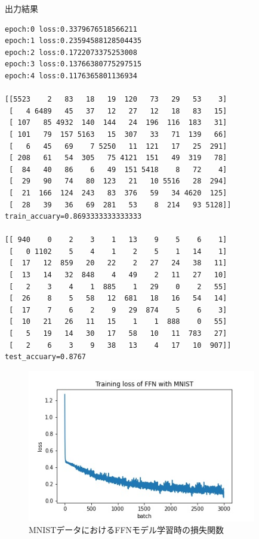 \documentclass[11pt, a4paper]{jsarticle}
\begin{document}
  \begin{itembox}[l]{出力結果}
    {\footnotesize
    \begin{verbatim}
epoch:0 loss:0.3379676518566211
epoch:1 loss:0.23594588128504435
epoch:2 loss:0.1722073375253008
epoch:3 loss:0.13766380775297515
epoch:4 loss:0.1176365801136934

[[5523    2   83   18   19  120   73   29   53    3]
 [   4 6489   45   37   12   27   12   18   83   15]
 [ 107   85 4932  140  144   24  196  116  183   31]
 [ 101   79  157 5163   15  307   33   71  139   66]
 [   6   45   69    7 5250   11  121   17   25  291]
 [ 208   61   54  305   75 4121  151   49  319   78]
 [  84   40   86    6   49  151 5418    8   72    4]
 [  29   90   74   80  123   21   10 5516   28  294]
 [  21  166  124  243   83  376   59   34 4620  125]
 [  28   39   36   69  281   53    8  214   93 5128]]
train_accuary=0.8693333333333333

[[ 940    0    2    3    1   13    9    5    6    1]
 [   0 1102    5    4    1    2    5    1   14    1]
 [  17   12  859   20   22    2   27   24   38   11]
 [  13   14   32  848    4   49    2   11   27   10]
 [   2    3    4    1  885    1   29    0    2   55]
 [  26    8    5   58   12  681   18   16   54   14]
 [  17    7    6    2    9   29  874    5    6    3]
 [  10   21   26   11   15    1    1  888    0   55]
 [   5   19   14   30   17   58   10   11  783   27]
 [   2    6    3    9   38   13    4   17   10  907]]
test_accuary=0.8767
    \end{verbatim}}
  \end{itembox}

  \begin{figure}[h]
    \centering
    \includegraphics[width=10cm]{images/exercise4.2.jpg}
    \caption{MNISTデータにおけるFFNモデル学習時の損失関数}
    \label{fig:mnist-ffn-loss}
  \end{figure}
\end{document}
